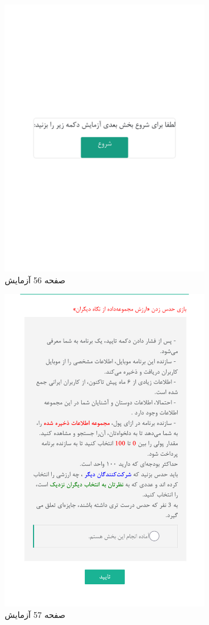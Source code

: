 \begin{figure}[htpb]
    \centering
    \includegraphics[width=0.8\textwidth]{./img/Task56.png}
    \caption{ صفحه 56 آزمایش }
    \label{fig:Task56}
\end{figure}


\begin{figure}[htpb]
    \centering
    \includegraphics[width=0.8\textwidth]{./img/Task57.png}
    \caption{ صفحه 57 آزمایش }
    \label{fig:Task57}
\end{figure}


